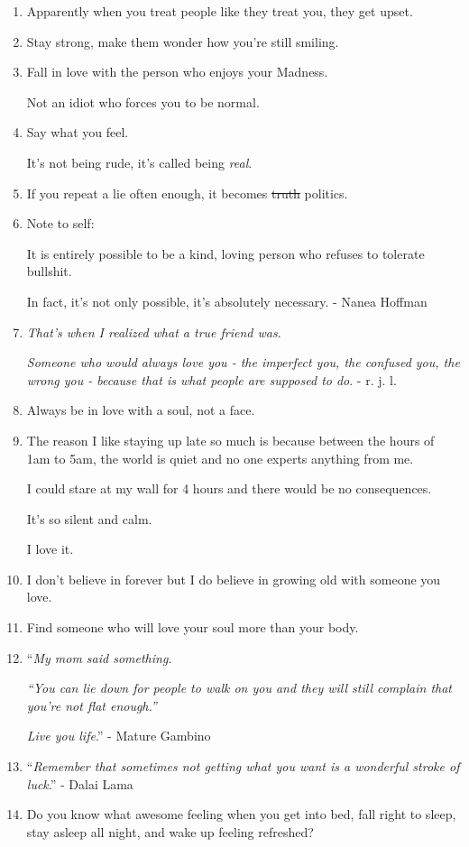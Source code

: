 \documentclass{article}
\numberwithin{equation}{section}
\begin{document}
\begin{enumerate}
    I can't even fake a hello to someone I don't like.
    \item Apparently when you treat people like they treat you, they get upset.
    \item Stay strong, make them wonder how you're still smiling.
    \item Fall in love with the person who enjoys your Madness.
    
    Not an idiot who forces you to be normal.
    \item Say what you feel.
    
    It's not being rude, it's called being \textit{real}.
    \item If you repeat a lie often enough, it becomes \st{truth} politics.
    \item Note to self:
    
    It is entirely possible to be a kind, loving person who refuses to tolerate bullshit.
    
    In fact, it's not only possible, it's absolutely necessary. - Nanea Hoffman
    \item \textit{That's when I realized what a true friend was}.
    
    \textit{Someone who would always love you - the imperfect you, the confused you, the wrong you - because that is what people are supposed to do}. - r. j. l.
    \item Always be in love with a soul, not a face.
    \item The reason I like staying up late so much is because between the hours of 1am to 5am, the world is quiet and no one experts anything from me.
    
    I could stare at my wall for 4 hours and there would be no consequences.
    
    It's so silent and calm.
    
    I love it.
    \item I don't believe in forever but I do believe in growing old with someone you love.
    \item Find someone who will love your soul more than your body.
    \item ``\textit{My mom said something}.
    
    \textit{``You can lie down for people to walk on you and they will still complain that you're not flat enough.''}
    
    \textit{Live you life}.'' - Mature Gambino
    \item ``\textit{Remember that sometimes not getting what you want is a wonderful stroke of luck}.'' - Dalai Lama
    \item Do you know what awesome feeling when you get into bed, fall right to sleep, stay asleep all night, and wake up feeling refreshed?
    

\end{enumerate}
\end{document}
